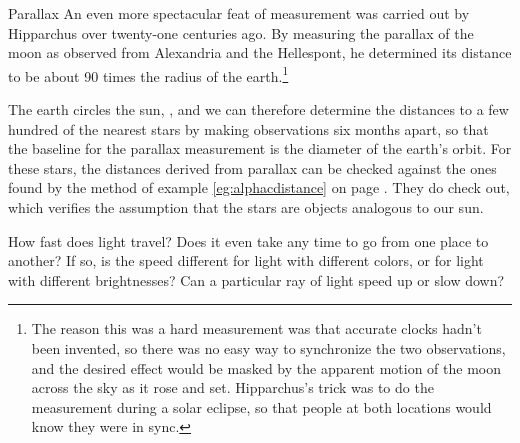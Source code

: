 \begin{envsubsection}{Parallax}
An even more spectacular feat of measurement was carried out by Hipparchus over
twenty-one centuries ago. By measuring the parallax of the moon as observed from
Alexandria and the Hellespont, he determined its distance to be about 90 times
the radius of the earth.\footnote{The reason this was
a hard measurement was that accurate clocks hadn't been invented, so there was no
easy way to synchronize the two observations, and the desired effect would be masked
by the apparent motion of the moon across the sky as it rose and set. Hipparchus's trick
was to do the measurement during a solar eclipse, so that people at both locations
would know they were in sync.}\label{hipparchusmoondistance}

The earth circles the sun, , and we can therefore determine the distances to a few
hundred of the nearest stars by making observations six months apart, so that the
baseline for the parallax measurement is the diameter of the earth's orbit. For these
stars, the distances derived from parallax can be checked against the ones found by
the method of example \ref{eg:alphacdistance} on page \pageref{eg:alphacdistance}. They
do check out, which verifies the assumption that the stars
are objects analogous to our sun.


\end{envsubsection}

How fast does light travel? Does it even take any time to go from one place to another?
If so, is the speed different for light with different colors, or for light with
different brightnesses? Can a particular ray of light speed up or slow down?

